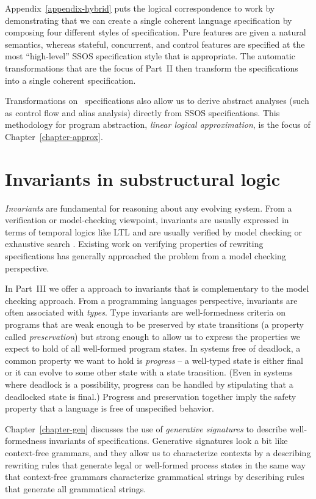 Appendix~\ref{appendix-hybrid} puts the logical correspondence to work
by demonstrating that we can create a single coherent language
specification by composing four different styles of specification.
Pure features are given a natural semantics, whereas stateful,
concurrent, and control features are specified at the most
``high-level'' SSOS specification style that is appropriate. The
automatic transformations that are the focus of Part~II then transform
the specifications into a single coherent specification.

Transformations on \sls~specifications also allow us to derive
abstract analyses (such as control flow and alias analysis) directly
from SSOS specifications. This methodology for program abstraction,
{\it linear logical approximation}, is the focus of
Chapter~\ref{chapter-approx}.

\section{Invariants in substructural logic}

{\it Invariants} are fundamental for reasoning about any evolving
system. From a verification or model-checking viewpoint, invariants
are usually expressed in terms of temporal logics like LTL and are
usually verified by model checking or exhaustive search
\cite[Chapter 10]{clavel11ltl}. Existing work
on verifying properties of rewriting specifications has generally
approached the problem from a model checking perspective. 

In Part~III we offer a approach to invariants that is complementary to
the model checking approach.  From a programming languages
perspective, invariants are often associated with {\it types}. Type
invariants are well-formedness criteria on programs that are weak
enough to be preserved by state transitions (a property called {\it
  preservation}) but strong enough to allow us to express the properties
we expect to hold of all well-formed program states. In systems free
of deadlock, a common property we want to hold is {\it progress} -- a
well-typed state is either final or it can evolve to some other state with a
state transition. (Even in systems where deadlock is a possibility,
progress can be handled by stipulating that a deadlocked state is
final.) Progress and preservation together imply the safety property
that a language is free of unspecified behavior. 

Chapter~\ref{chapter-gen} discusses the use of {\it generative signatures} to
describe well-formedness invariants of specifications. Generative
signatures look a bit like context-free grammars, and they allow us to
characterize contexts by a describing rewriting rules that generate
legal or well-formed
process states in the same way that context-free grammars characterize
grammatical strings by describing rules that generate all grammatical
strings.

